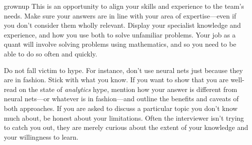 \begin{answer}{grownup}
This is an opportunity to align your skills and experience to the team's needs.
Make sure your answers are in line with your area of expertise---even if you don't consider them wholly relevant.
Display your specialist knowledge and experience, and how you use both to solve unfamiliar problems.
Your job as a quant will involve solving problems using mathematics,
and so you need to be able to do so often and quickly.

Do not fall victim to hype.
For instance, don't use neural nets just because they are in fashion.
Stick with what you know.
If you want to show that you are well-read on the state of \emph{analytics} hype, mention how your answer is different from neural nets---or whatever is in fashion---and outline the benefits and caveats of both approaches.
If you are asked to discuss a particular topic you don't know much about, be honest about your limitations.
Often the interviewer isn't trying to catch you out, they are merely curious about the extent of your knowledge and your willingness to learn.

\end{answer}
